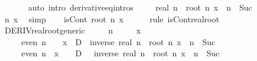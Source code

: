 \begin{isabellebody}
\ \ \ \ \isamarkupfalse%
\ \ {\isacharparenleft}{\kern0pt}auto\ intro{\isacharbang}{\kern0pt}{\isacharcolon}{\kern0pt}\ derivative{\isacharunderscore}{\kern0pt}eq{\isacharunderscore}{\kern0pt}intros{\isacharparenright}{\kern0pt}\isanewline
\ \ \isamarkupfalse%
\ {\isachardoublequoteopen}{\isacharminus}{\kern0pt}\ real\ n\ {\isacharasterisk}{\kern0pt}\ root\ n\ x\ {\isacharcircum}{\kern0pt}\ {\isacharparenleft}{\kern0pt}n\ {\isacharminus}{\kern0pt}\ Suc\ {}{\isacharparenright}{\kern0pt}\ {\isasymnoteq}\ {}{\isachardoublequoteclose}\isanewline
\ \ \ \ \isamarkupfalse%
\ n\ x\ \isamarkupfalse%
\ simp\isanewline
\ \ \isamarkupfalse%
\ {\isachardoublequoteopen}isCont\ {\isacharparenleft}{\kern0pt}root\ n{\isacharparenright}{\kern0pt}\ x{\isachardoublequoteclose}\isanewline
\ \ \ \ \isamarkupfalse%
\ {\isacharparenleft}{\kern0pt}rule\ isCont{\isacharunderscore}{\kern0pt}real{\isacharunderscore}{\kern0pt}root{\isacharparenright}{\kern0pt}\isanewline
{}\isamarkupfalse%
%
\endisatagproof
{\isafoldproof}%
%
\isadelimproof
\isanewline
%
\endisadelimproof
\isanewline
{}\isamarkupfalse%
\ DERIV{\isacharunderscore}{\kern0pt}real{\isacharunderscore}{\kern0pt}root{\isacharunderscore}{\kern0pt}generic{\isacharcolon}{\kern0pt}\isanewline
\ \ \ {\isachardoublequoteopen}{}\ {\isacharless}{\kern0pt}\ n{\isachardoublequoteclose}\isanewline
\ \ \ \ \ {\isachardoublequoteopen}x\ {\isasymnoteq}\ {}{\isachardoublequoteclose}\isanewline
\ \ \ \ \ {\isachardoublequoteopen}even\ n\ {\isasymLongrightarrow}\ {}\ {\isacharless}{\kern0pt}\ x\ {\isasymLongrightarrow}\ D\ {\isacharequal}{\kern0pt}\ inverse\ {\isacharparenleft}{\kern0pt}real\ n\ {\isacharasterisk}{\kern0pt}\ root\ n\ x\ {\isacharcircum}{\kern0pt}\ {\isacharparenleft}{\kern0pt}n\ {\isacharminus}{\kern0pt}\ Suc\ {}{\isacharparenright}{\kern0pt}{\isacharparenright}{\kern0pt}{\isachardoublequoteclose}\isanewline
\ \ \ \ \ {\isachardoublequoteopen}even\ n\ {\isasymLongrightarrow}\ x\ {\isacharless}{\kern0pt}\ {}\ {\isasymLongrightarrow}\ D\ {\isacharequal}{\kern0pt}\ {\isacharminus}{\kern0pt}\ inverse\ {\isacharparenleft}{\kern0pt}real\ n\ {\isacharasterisk}{\kern0pt}\ root\ n\ x\ {\isacharcircum}{\kern0pt}\ {\isacharparenleft}{\kern0pt}n\ {\isacharminus}{\kern0pt}\ Suc\ {}{\isacharparenright}{\kern0pt}{\isacharparenright}{\kern0pt}{\isachardoublequoteclose}\isanewline

\end{isabellebody}
